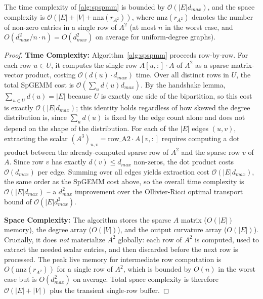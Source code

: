\documentclass{siuro250211}
\theoremstyle{remark}
\theoremstyle{plain}
\begin{document}
\begin{theorem}
\label{thm:complexity}
The time complexity of \cref{alg:spspmm} is bounded by $\mathcal{O}(|E| d_{max})$, and the space complexity is $\mathcal{O}(|E| + |V| + \mathrm{nnz}(r_{A^2}))$, where $\mathrm{nnz}(r_{A^2})$ denotes the number of non-zero entries in a single row of $A^2$ (at most $n$ in the worst case, and $O(d_{max}^2/n \cdot n) = O(d_{max}^2)$ on average for uniform-degree graphs).
\end{theorem}

\begin{proof}
\textbf{Time Complexity:} Algorithm~\ref{alg:spspmm} proceeds row-by-row. For each row $u \in U$, it computes the single row $A[u,:]\cdot A$ of $A^2$ as a sparse matrix-vector product, costing $\mathcal{O}(d(u) \cdot d_{max})$ time. Over all distinct rows in $U$, the total SpGEMM cost is $\mathcal{O}(\sum_u d(u) d_{max})$. By the handshake lemma, $\sum_{u \in U} d(u) = |E|$ because $U$ is exactly one side of the bipartition, so this cost is exactly $\mathcal{O}(|E| d_{max})$; this identity holds regardless of how skewed the degree distribution is, since $\sum_u d(u)$ is fixed by the edge count alone and does not depend on the shape of the distribution. For each of the $|E|$ edges $(u,v)$, extracting the scalar $(A^3)_{u,v} = \text{row\_A2} \cdot A[v,:]$ requires computing a dot product between the already-computed sparse row of $A^2$ and the sparse row $v$ of $A$. Since row $v$ has exactly $d(v) \le d_{max}$ non-zeros, the dot product costs $\mathcal{O}(d_{max})$ per edge. Summing over all edges yields extraction cost $\mathcal{O}(|E| d_{max})$, the same order as the SpGEMM cost above, so the overall time complexity is $\mathcal{O}(|E| d_{max})$ -- a $d_{max}^2$ improvement over the Ollivier-Ricci optimal transport bound of $\mathcal{O}(|E| d_{max}^3)$.

\textbf{Space Complexity:} The algorithm stores the sparse $A$ matrix ($O(|E|)$ memory), the degree array ($O(|V|)$), and the output curvature array ($O(|E|)$). Crucially, it does \emph{not} materialize $A^2$ globally: each row of $A^2$ is computed, used to extract the needed scalar entries, and then discarded before the next row is processed. The peak live memory for intermediate row computation is $O(\mathrm{nnz}(r_{A^2}))$ for a single row of $A^2$, which is bounded by $O(n)$ in the worst case but is $O(d_{max}^2)$ on average. Total space complexity is therefore $\mathcal{O}(|E| + |V|)$ plus the transient single-row buffer.
\end{proof}
\end{document}
